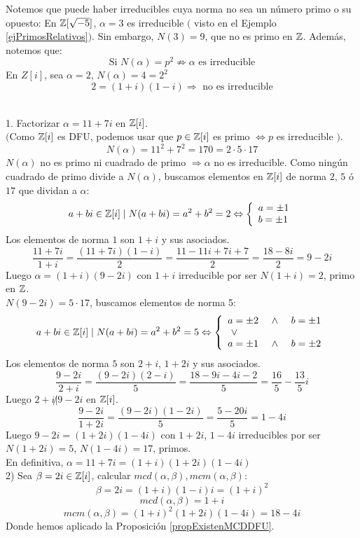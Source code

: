 Notemos que puede haber irreducibles cuya norma no sea un número primo o su opuesto:
En $\mathbb Z[\sqrt{-5}]$, $\alpha = 3$ es irreducible $($ visto en el Ejemplo \ref{ejPrimosRelativos}$)$. Sin embargo, $N(3)=9$, que
no es primo en $\mathbb Z$. Además, notemos que:
$$\mbox{Si } N(\alpha) = p^2 \nRightarrow \alpha \mbox{ es irreducible}$$
En $Z[i]$, sea $\alpha = 2$, $N(\alpha)=4=2^2$
$$2=(1+i)(1-i) \Rightarrow \mbox{ no es irreducible}$$

\begin{ejemplo}
    \ \\
    1. Factorizar $\alpha = 11+7i$ en $\mathbb Z[i]$.\\

    
    $($Como $\mathbb Z[i]$ es DFU, podemos usar que $p \in \mathbb Z[i]$ es primo $\Leftrightarrow p$ es irreducible $)$.\newline
    $$N(\alpha) = 11^2 + 7^2 = 170 = 2 \cdot 5 \cdot 17$$
    $N(\alpha)$ no es primo ni cuadrado de primo $\Rightarrow \alpha$ no es irreducible.\newline
    Como ningún cuadrado de primo divide a $N(\alpha)$, buscamos elementos en $\mathbb Z[i]$ de norma $2$, $5$ ó $17$ que
    dividan a $\alpha$:
    $$a+bi \in \mathbb Z[i] \mid N(a+bi) = a^2 + b^2 = 2 \Leftrightarrow \left\{ \begin{array}{l}
            a = \pm 1 \\
            b = \pm 1
        \end{array} \right.$$
    Los elementos de norma $1$ son $1+i$ y sus asociados.
    $$\dfrac{11+7i}{1+i} = \dfrac{(11+7i)(1-i)}{2} = \dfrac{11-11i+7i+7}{2} = \dfrac{18-8i}{2} = 9-2i$$
    Luego $\alpha = (1+i)(9-2i)$ con $1+i$ irreducible por ser $N(1+i) = 2$, primo en $\mathbb Z$.\\

    
    $N(9-2i) = 5 \cdot 17$, buscamos elementos de norma 5:
    $$a+bi \in \mathbb Z[i] \mid N(a+bi) = a^2 + b^2 = 5 \Leftrightarrow \left\{ \begin{array}{lll}
            a = \pm 2 & \ \land \  & b = \pm 1 \\
            \ \lor \         &    &           \\
            a = \pm 1 & \ \land \  & b = \pm 2
        \end{array} \right.$$
    Los elementos de norma $5$ son $2+i$, $1+2i$ y sus asociados.
    $$\dfrac{9-2i}{2+i}= \dfrac{(9-2i)(2-i)}{5} = \dfrac{18-9i-4i-2}{5} = \dfrac{16}{5}-\dfrac{13}{5}i$$
    Luego $2+i\not|9-2i$ en $\mathbb Z[i]$.
    $$\dfrac{9-2i}{1+2i} = \dfrac{(9-2i)(1-2i)}{5} = \dfrac{5-20i}{5} = 1-4i$$
    Luego $9-2i = (1+2i)(1-4i)$ con $1+2i$, $1-4i$ irreducibles por ser $N(1+2i)=5$, $N(1-4i)=17$, primos.\\

    
    En definitiva, $\alpha = 11+7i = (1+i)(1+2i)(1-4i)$\\

    
    2) Sea $\beta = 2i \in \mathbb Z[i]$, calcular $mcd(\alpha, \beta), mcm(\alpha, \beta)$:
    $$\beta = 2i = (1+i)(1-i)i = (1+i)^2$$
    $$mcd(\alpha, \beta) = 1+i$$
    $$mcm(\alpha, \beta) = (1+i)^2(1+2i)(1-4i) = 18-4i$$
    Donde hemos aplicado la Proposición \ref{propExistenMCDDFU}.
\end{ejemplo}

